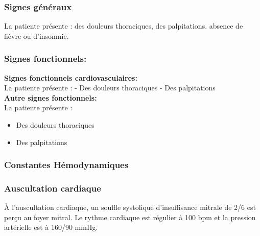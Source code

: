 \documentclass[12pt,a4paper]{article}%
\begin{document}
%
\subsubsection*{Signes généraux}%
\label{ssubsec:Signesgnraux}%

%
La patiente présente : des douleurs thoraciques, des palpitations. absence de fièvre ou d'insomnie.%
\subsubsection*{Signes fonctionnels:}%
\label{ssubsec:Signesfonctionnels}%

%
\textbf{Signes fonctionnels cardiovasculaires:}%
\\%
La patiente présente :\newline%
{-} Des douleurs thoraciques\newline%
{-} Des palpitations%
\\%
\textbf{Autre signes fonctionnels:}%
\\%
La patiente présente :%
\begin{itemize}%
\setlength{\itemsep}{0pt}%
\item%
Des douleurs thoraciques%
\item%
Des palpitations%
\end{itemize}%
\subsubsection*{Constantes Hémodynamiques}%
\label{ssubsec:ConstantesHmodynamiques}%

%


\begin{table}[h!]%
\centering%
%
\end{table}

%
\subsubsection*{Auscultation cardiaque}%
\label{ssubsec:Auscultationcardiaque}%

%
À l'auscultation cardiaque, un souffle systolique d'insuffisance mitrale de 2/6 est perçu au foyer mitral. Le rythme cardiaque est régulier à 100 bpm et la pression artérielle est à 160/90 mmHg.%
\end{document}
